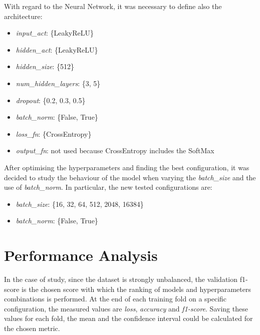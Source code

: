 \documentclass[../main]{subfiles}
\begin{document}
With regard to the Neural Network, it was necessary to define also the architecture:
\begin{itemize}
    \item \textit{input\_act}: \{LeakyReLU\}
    \item \textit{hidden\_act}: \{LeakyReLU\}
    \item \textit{hidden\_size}: \{512\}
    \item \textit{num\_hidden\_layers}: \{3, 5\}
    \item \textit{dropout}: \{0.2, 0.3, 0.5\}
    \item \textit{batch\_norm}: \{False, True\}
    \item \textit{loss\_fn}: \{CrossEntropy\}
    \item \textit{output\_fn}: not used because CrossEntropy includes the SoftMax
\end{itemize}

After optimising the hyperparameters and finding the best configuration, it was decided to study the behaviour of the model when varying the \textit{batch\_size} and the use of \textit{batch\_norm}.
In particular, the new tested configurations are:
\begin{itemize}
    \item \textit{batch\_size}: \{16, 32, 64, 512, 2048, 16384\}
    \item \textit{batch\_norm}: \{False, True\}
\end{itemize}

\section{Performance Analysis}
In the case of study, since the dataset is strongly unbalanced, the validation f1-score is the chosen score with which the ranking of models and hyperparameters combinations is performed.
At the end of each training fold on a specific configuration, the measured values are \textit{loss}, \textit{accuracy} and \textit{f1-score}.
Saving these values for each fold, the mean and the confidence interval could be calculated for the chosen metric.
\end{document}
